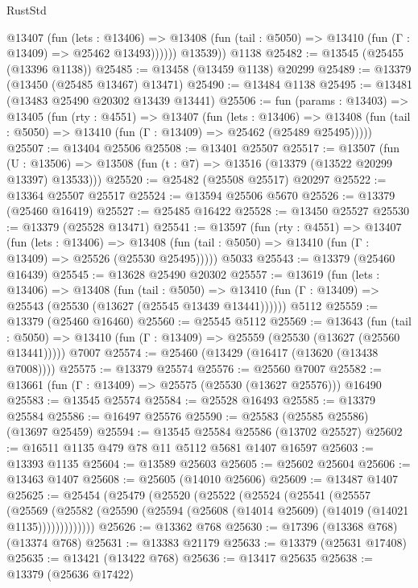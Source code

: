 \begin{lexlean}{RustStd}
\begin{coremodule}
            @13407
              (fun (lets : @13406) =>
              @13408 (fun (tail : @5050) => @13410 (fun (Γ : @13409) => @25462 @13493))))))
        @13539))
    @1138
@25482 := @13545 (@25455 (@13396 @1138))
@25485 := @13458 (@13459 @1138) @20299
@25489 := @13379 (@13450 (@25485 @13467) @13471)
@25490 := @13484 @1138
@25495 := @13481 (@13483 @25490 @20302 @13439 @13441)
@25506 := fun (params : @13403) =>
  @13405
    (fun (rty : @4551) =>
    @13407
      (fun (lets : @13406) =>
      @13408 (fun (tail : @5050) => @13410 (fun (Γ : @13409) => @25462 (@25489 @25495)))))
@25507 := @13404 @25506
@25508 := @13401 @25507
@25517 := @13507
    (fun (U : @13506) => @13508 (fun (t : @7) => @13516 (@13379 (@13522 @20299 @13397) @13533)))
@25520 := @25482 (@25508 @25517) @20297
@25522 := @13364 @25507 @25517
@25524 := @13594 @25506 @5670
@25526 := @13379 (@25460 @16419)
@25527 := @25485 @16422
@25528 := @13450 @25527
@25530 := @13379 (@25528 @13471)
@25541 := @13597
    (fun (rty : @4551) =>
    @13407
      (fun (lets : @13406) =>
      @13408 (fun (tail : @5050) => @13410 (fun (Γ : @13409) => @25526 (@25530 @25495)))))
    @5033
@25543 := @13379 (@25460 @16439)
@25545 := @13628 @25490 @20302
@25557 := @13619
    (fun (lets : @13406) =>
    @13408
      (fun (tail : @5050) =>
      @13410 (fun (Γ : @13409) => @25543 (@25530 (@13627 (@25545 @13439 @13441))))))
    @5112
@25559 := @13379 (@25460 @16460)
@25560 := @25545 @5112
@25569 := @13643
    (fun (tail : @5050) => @13410 (fun (Γ : @13409) => @25559 (@25530 (@13627 (@25560 @13441)))))
    @7007
@25574 := @25460 (@13429 (@16417 (@13620 (@13438 @7008))))
@25575 := @13379 @25574
@25576 := @25560 @7007
@25582 := @13661 (fun (Γ : @13409) => @25575 (@25530 (@13627 @25576))) @16490
@25583 := @13545 @25574
@25584 := @25528 @16493
@25585 := @13379 @25584
@25586 := @16497 @25576
@25590 := @25583 (@25585 @25586) (@13697 @25459)
@25594 := @13545 @25584 @25586 (@13702 @25527)
@25602 := @16511 @1135 @479 @78 @11 @5112 @5681 @1407 @16597
@25603 := @13393 @1135
@25604 := @13589 @25603
@25605 := @25602 @25604
@25606 := @13463 @1407
@25608 := @25605 (@14010 @25606)
@25609 := @13487 @1407
@25625 := @25454
    (@25479
      (@25520
        (@25522
          (@25524
            (@25541
              (@25557
                (@25569
                  (@25582 (@25590 (@25594 (@25608 (@14014 @25609) (@14019 (@14021 @1135)))))))))))))
@25626 := @13362 @768
@25630 := @17396 (@13368 @768) (@13374 @768)
@25631 := @13383 @21179
@25633 := @13379 (@25631 @17408)
@25635 := @13421 (@13422 @768)
@25636 := @13417 @25635
@25638 := @13379 (@25636 @17422)

\end{coremodule}
\end{lexlean}
